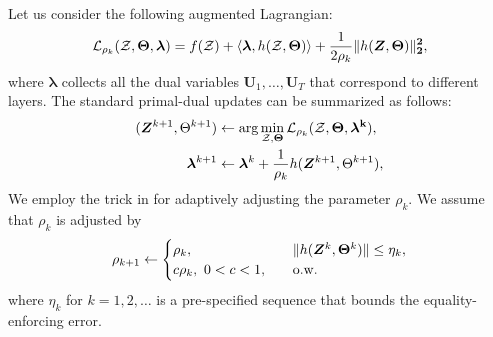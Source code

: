 Let us consider the following augmented Lagrangian:
\[          {\cal L}_{\rho_k}(\mathcal{Z},{\bf \Theta},{\bm \lambda})=f(\mathcal{Z}) + \langle \bm \lambda, h(\mathcal{Z},{\bf \Theta})\rangle + \frac{1}{2\rho_k}\|h(\bm Z,\bf \Theta)\|_2^2,  \]
where $\bm \lambda$ collects all the dual variables $\bm U_1,\ldots,\bm U_T$ that correspond to different layers. The standard primal-dual updates can be summarized as follows:
\begin{subequations}\label{eq:stopdd}
\begin{align}
    (\bm Z^{k+1},\Theta^{k+1}) &\leftarrow  \arg\min_{\mathcal{Z},\bf \Theta}  {\cal L}_{\rho_k}(\mathcal{Z},\bf \Theta,\bm \lambda^k), \label{eq:primal}\\
    \bm \lambda^{k+1} &\leftarrow \bm \lambda^k + \frac{1}{\rho_k}h(\bm Z^{k+1}, \Theta^{k+1}),
\end{align}
\end{subequations}
We employ the trick in \cite{shi2017penalty} for adaptively adjusting the parameter $\rho_k$. We assume that $\rho_k$ is adjusted by
\begin{align}\label{eq:rho}
    \rho_{k+1} \leftarrow \begin{cases}  \rho_k,&\quad \|h(\bm Z^{k},\bm \Theta^k)\|\leq \eta_k,\\
                                         c\rho_k,~0<c<1,&\quad {\rm o.w.}
    \end{cases}
\end{align}
where $\eta_k$ for $k=1,2,\ldots$ is a pre-specified sequence that bounds the equality-enforcing error.

